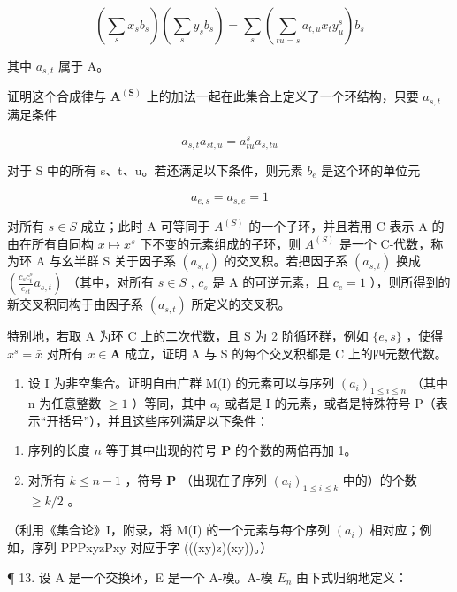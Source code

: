 \[
\left(\sum_ {s} x _ {s} b _ {s}\right) \left(\sum_ {s} y _ {s} b _ {s}\right) = \sum_ {s} \left(\sum_ {t u = s} a _ {t, u} x _ {t} y _ {u} ^ {s}\right) b _ {s}
\]

其中 \(a_{s,t}\) 属于 A。

证明这个合成律与 \(\mathbf{A}^{(\mathbf{S})}\) 上的加法一起在此集合上定义了一个环结构，只要 \(a_{s,t}\) 满足条件

\[
a _ {s, t} a _ {s t, u} = a _ {t u} ^ {s} a _ {s, t u}
\]

对于 S 中的所有 s、t、u。若还满足以下条件，则元素 \(b_{e}\) 是这个环的单位元

\[
a _ {e, s} = a _ {s, e} = 1
\]

对所有 \(s \in S\) 成立；此时 A 可等同于 \(A^{(S)}\) 的一个子环，并且若用 C 表示 A 的由在所有自同构 \(x \mapsto x^s\) 下不变的元素组成的子环，则 \(A^{(S)}\) 是一个 C-代数，称为环 A 与幺半群 S 关于因子系 \((a_{s,t})\) 的交叉积。若把因子系 \((a_{s,t})\) 换成 \(\left(\frac{c_s c_t^s}{c_{st}} a_{s,t}\right)\) （其中，对所有 \(s \in S\) , \(c_s\) 是 A 的可逆元素，且 \(c_e = 1\) ），则所得到的新交叉积同构于由因子系 \((a_{s,t})\) 所定义的交叉积。

特别地，若取 A 为环 C 上的二次代数，且 S 为 2 阶循环群，例如 \(\{e, s\}\) ，使得 \(x^s = \bar{x}\) 对所有 \(x \in \mathbf{A}\) 成立，证明 A 与 S 的每个交叉积都是 C 上的四元数代数。

\begin{enumerate}
\def\labelenumi{\arabic{enumi}.}
\setcounter{enumi}{11}
\tightlist
\item
  设 I 为非空集合。证明自由广群 M(I) 的元素可以与序列 \((a_{i})_{1 \leqslant i \leqslant n}\) （其中 n 为任意整数 \(\geqslant 1\) ）等同，其中 \(a_{i}\) 或者是 I 的元素，或者是特殊符号 P（表示“开括号”），并且这些序列满足以下条件：
\end{enumerate}

\begin{enumerate}
\def\labelenumi{(\roman{enumi})}
\item
  序列的长度 \(n\) 等于其中出现的符号 \(\mathbf{P}\) 的个数的两倍再加 1。
\item
  对所有 \(k \leqslant n - 1\) ，符号 \(\mathbf{P}\) （出现在子序列 \((a_i)_{1 \leqslant i \leqslant k}\) 中的）的个数 \(\geqslant k / 2\) 。
\end{enumerate}

（利用《集合论》I，附录，将 M(I) 的一个元素与每个序列 \((a_i)\) 相对应；例如，序列 PPPxyzPxy 对应于字 (((xy)z)(xy))。）

¶ 13. 设 A 是一个交换环，E 是一个 A-模。A-模 \(E_{n}\) 由下式归纳地定义：

